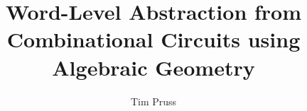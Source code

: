 \documentclass[Chicago]{uuthesis2e}
\title{Word-Level Abstraction from Combinational Circuits using Algebraic Geometry}
\author{Tim Pruss}
\newcommand{\ls}[1]
    {\dimen0=\fontdimen6\the\font
     \lineskip=#1\dimen0
     \advance\lineskip.5\fontdimen5\the\font
     \advance\lineskip-\dimen0
     \lineskiplimit=.9\lineskip
     \baselineskip=\lineskip
     \advance\baselineskip\dimen0
     \normallineskip\lineskip
     \normallineskiplimit\lineskiplimit
     \normalbaselineskip\baselineskip
     \ignorespaces
    }
\begin{document}

\frontmatterformat
\titlepage
\copyrightpage
\committeeapproval
\readingapproval

\tableofcontents
\listoffigures
\listoftables


\maintext       %






%
%
%
%









\end{document}
